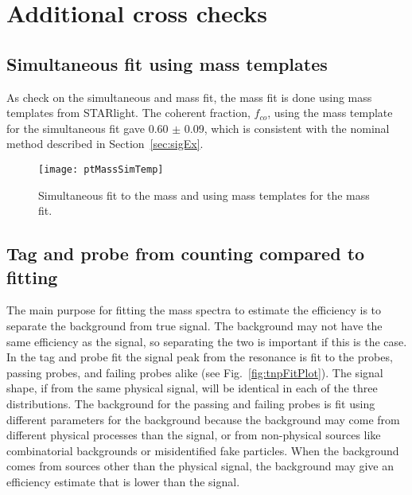   \section{\label{sec:extraSys}Additional cross checks}
    \subsection{Simultaneous fit using mass templates}
      As check on the simultaneous \pt{} and mass fit, the mass fit is done
        using mass templates from STARlight.
      The coherent fraction, $f_{co}$, using the mass template for the 
        simultaneous fit gave 0.60 $\pm$ 0.09, which is consistent with the 
        nominal method described in Section~\ref{sec:sigEx}.
      \begin{figure}[!Hhbt]
        \centering
        \texttt{[image: ptMassSimTemp]}
        \caption{Simultaneous fit to the mass and \pt{} using mass templates
          for the mass fit. }
        \label{fig:simFitTemp}
      \end{figure}

    \subsection{Tag and probe from counting compared to fitting}
      The main purpose for fitting the mass spectra to estimate the efficiency
        is to separate the background from \DIFaddbegin {}\DIFaddend true signal. 
      The background may not have the same efficiency as the signal, so 
        separating the two is important if this is the case.
      In the tag and probe fit the signal peak from the \JPsi{} resonance
        is fit to the probes, passing probes, and failing probes alike (see
        Fig.~\ref{fig:tnpFitPlot}). 
      The signal shape, if from the same physical signal, will be 
        identical in each of the three distributions. 
      The background for the passing and failing probes is fit using 
        different parameters for the background because the background
        may come from different physical processes than the signal, or from 
        non-physical sources like combinatorial backgrounds or misidentified
        fake particles.
      When the background comes from sources other than the physical signal,
        the background may give an efficiency estimate that is lower than
        the signal. 

